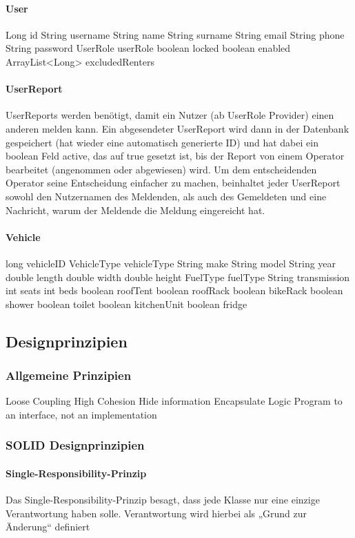\paragraph{User}
Long id
String username
String name
String surname
String email
String phone
String password
UserRole userRole
boolean locked
boolean enabled
ArrayList<Long> excludedRenters

\paragraph{UserReport}
UserReports werden benötigt, damit ein Nutzer (ab UserRole Provider) einen anderen melden kann. Ein abgesendeter UserReport wird dann in der Datenbank gespeichert (hat wieder eine automatisch generierte ID) und hat dabei ein boolean Feld active, das auf true gesetzt ist, bis der Report von einem Operator bearbeitet (angenommen oder abgewiesen) wird. Um dem entscheidenden Operator seine Entscheidung einfacher zu machen, beinhaltet jeder UserReport sowohl den Nutzernamen des Meldenden, als auch des Gemeldeten und eine Nachricht, warum der Meldende die Meldung eingereicht hat.

\paragraph{Vehicle}
long vehicleID
VehicleType vehicleType
String make
String model
String year
double length
double width
double height
FuelType fuelType
String transmission
int seats
int beds
boolean roofTent
boolean roofRack
boolean bikeRack
boolean shower
boolean toilet
boolean kitchenUnit
boolean fridge


\subsection{Designprinzipien}

\subsubsection{Allgemeine Prinzipien}
Loose Coupling
High Cohesion
Hide information
Encapsulate Logic
Program to an interface, not an implementation

\subsubsection{SOLID Designprinzipien}

\paragraph{Single-Responsibility-Prinzip}
Das Single-Responsibility-Prinzip besagt, dass jede Klasse nur eine einzige Verantwortung haben solle. Verantwortung wird hierbei als „Grund zur Änderung“ definiert

